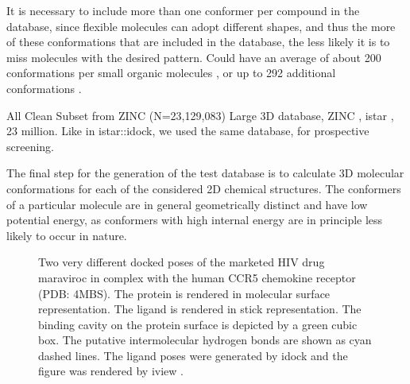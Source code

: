 It is necessary to include more than one conformer per compound in the database, since flexible molecules can adopt different shapes, and thus the more of these conformations that are included in the database, the less likely it is to miss molecules with the desired pattern. Could have an average of about 200 conformations per small organic molecules \citep{1332}, or up to 292 additional conformations \citep{1280}.

All Clean Subset from ZINC (N=23,129,083)
Large 3D database, ZINC \citep{532,1178}, istar \citep{1362}, 23 million.
Like in istar::idock, we used the same database, for prospective screening.

The final step for the generation of the test database is to calculate 3D molecular conformations for each of the considered 2D chemical structures. The conformers of a particular molecule are in general geometrically distinct and have low potential energy, as conformers with high internal energy are in principle less likely to occur in nature.

\begin{figure}
\centering
{}
\caption{Two very different docked poses of the marketed HIV drug maraviroc in complex with the human CCR5 chemokine receptor (PDB: 4MBS). The protein is rendered in molecular surface representation. The ligand is rendered in stick representation. The binding cavity on the protein surface is depicted by a green cubic box. The putative intermolecular hydrogen bonds are shown as cyan dashed lines. The ligand poses were generated by idock \citep{1153} and the figure was rendered by iview \citep{1366}.}
\label{usr:MRV}
\end{figure}

